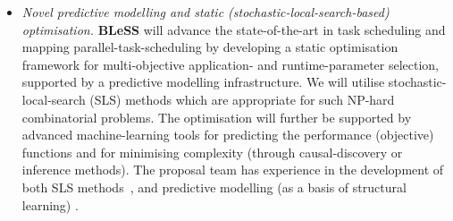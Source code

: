 \documentclass[a4paper,11pt]{article}
\newcommand{\project}[1]{\textbf{#1}\xspace}
\newcommand{\BLESS}{\project{BLeSS}}
\newcommand{\TheProject}{\BLESS}
\begin{document}
\begin{itemize}
\item \emph{Novel predictive modelling and static (stochastic-local-search-based) optimisation.} 
\TheProject will advance the state-of-the-art in task scheduling and mapping
parallel-task-scheduling by developing a static optimisation framework
for multi-objective application- and runtime-parameter selection, supported
by a predictive modelling infrastructure. We will utilise stochastic-local-search 
(SLS) methods which are appropriate for such NP-hard combinatorial problems. 
The optimisation will further be supported by advanced machine-learning tools 
for predicting the performance (objective) functions and for minimising complexity 
(through causal-discovery or inference methods). The proposal team has experience in 
the development of both SLS methods~\cite{chasparis_optimization_2016,chasparis_evolutionary_2017}, 
and predictive modelling (as a basis of structural learning) \cite{kosorus_relevance_2013}. %





\end{itemize}
\end{document}
